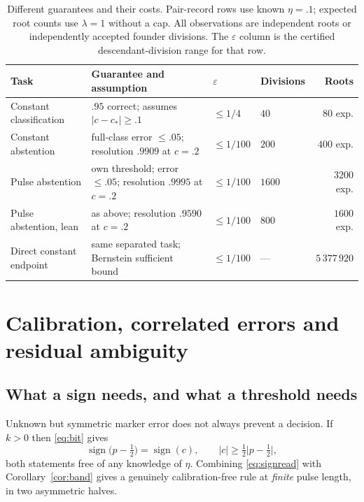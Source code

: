 \documentclass[11pt]{article}
\theoremstyle{plain}
\theoremstyle{definition}
\theoremstyle{remark}
\newcommand{\eps}{\varepsilon}
\newcommand{\sgn}{\operatorname{sign}}
\begin{document}
\begin{table}[tb]
\centering\small
\caption{Different guarantees and their costs. Pair-record rows use known
$\eta=.1$; expected root counts use $\lambda=1$ without a cap. All observations
are independent roots or independently accepted founder divisions. The $\eps$
column is the certified descendant-division range for that row.}
\label{tab:cost}
\begin{tabularx}{\linewidth}{@{}lXllr@{}}
\toprule
Task & Guarantee and assumption & $\eps$ & Divisions & Roots\\\midrule
Constant classification & $.95$ correct; assumes $|c-c_*|\ge.1$ & $\le1/4$ & $40$ & $80$ exp.\\
Constant abstention & full-class error $\le.05$; resolution $.9909$ at $c=.2$ & $\le1/100$ & $200$ & $400$ exp.\\
Pulse abstention & own threshold; error $\le.05$; resolution $.9995$ at $c=.2$ & $\le1/100$ & $1600$ & $3200$ exp.\\
Pulse abstention, lean & as above; resolution $.9590$ at $c=.2$ & $\le1/100$ & $800$ & $1600$ exp.\\
Direct constant endpoint & same separated task; Bernstein sufficient bound & $\le1/100$ & --- & $5\,377\,920$\\
\bottomrule
\end{tabularx}
\end{table}

\section{Calibration, correlated errors and residual ambiguity}
\label{sec:calibration}

\subsection{What a sign needs, and what a threshold needs}

Unknown but symmetric marker error does not always prevent a decision. If
$k>0$ then \eqref{eq:bit} gives
\begin{equation}\label{eq:signread}
 \sgn\bigl(p-\tfrac12\bigr)=\sgn(c),\qquad |c|\ge\tfrac12\bigl|p-\tfrac12\bigr| ,
\end{equation}
both statements free of any knowledge of $\eta$. Combining
\eqref{eq:signread} with Corollary~\ref{cor:band} gives a genuinely
calibration-free rule at \emph{finite} pulse length, in two asymmetric halves.
\end{document}
